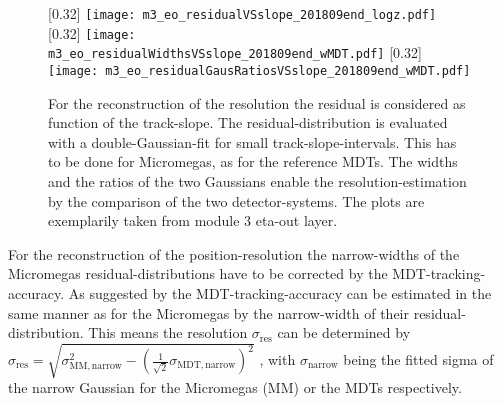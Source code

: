 \documentclass[
twoside,            %
BCOR1.4cm,          %
10pt,               %
headings=normal,    %
headsepline,        %
clearplainpage,		%
final,              %
div=14,
open=right,
bibliography=toc
]{scrreprt}
\begin{document}
\begin{figure}[!h]
	\centering
	[0.32\textwidth]
	{\texttt{[image: m3\_eo\_residualVSslope\_201809end\_logz.pdf]}}
	\hfill
	[0.32\textwidth]
	{\texttt{[image: m3\_eo\_residualWidthsVSslope\_201809end\_wMDT.pdf]}}
	\hfill
	[0.32\textwidth]
	{\texttt{[image: m3\_eo\_residualGausRatiosVSslope\_201809end\_wMDT.pdf]}}
	\vspace{-2mm}
	\caption{
		For the reconstruction of the resolution the residual is considered as function of the track-slope.
		The residual-distribution is evaluated with a double-Gaussian-fit for small track-slope-intervals.
		This has to be done for Micromegas, as for the reference MDTs.
		The widths and the ratios of the two Gaussians enable the resolution-estimation by the comparison of the two detector-systems.
		The plots are exemplarily taken from module 3 eta-out layer.
	}
	\label{centroidResidual}
\end{figure}

For the reconstruction of the position-resolution the narrow-widths of the Micromegas residual-distributions have to be corrected by the MDT-tracking-accuracy.
As suggested by \cite{loeselThesis} the MDT-tracking-accuracy can be estimated in the same manner as for the Micromegas by the narrow-width of their residual-distribution.
This means the resolution $\sigma_{\mathrm{res}}$ can be determined by 
$\sigma_{\mathrm{res}} = \sqrt{ \sigma_{\mathrm{MM,narrow}}^2 - \left( \tfrac{1}{\sqrt{2}} \sigma_{\mathrm{MDT,narrow}}\right)^2 }$
, with $\sigma_{\mathrm{narrow}}$ being the fitted sigma of the narrow Gaussian for the Micromegas (MM) or the MDTs respectively.
\end{document}

